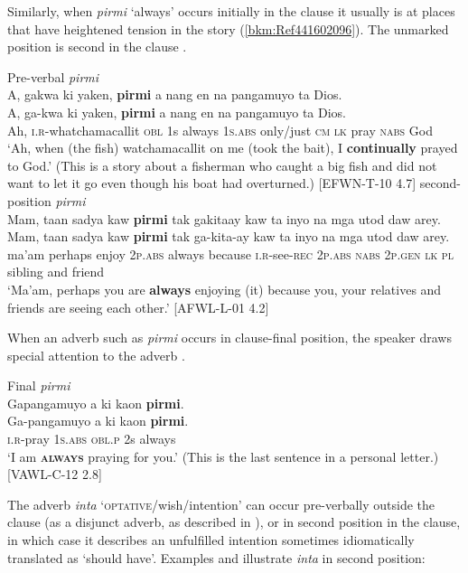 Similarly, when \textit{pirmi} ‘always’ occurs initially in the clause it usually is at places that have heightened tension in the story (\ref{bkm:Ref441602096}). The unmarked position is second in the clause .

\ea
\label{bkm:Ref441602096}Pre-verbal \textit{pirmi} \\
A,  gakwa  ki  yaken,  \textbf{pirmi}  a  nang  en  na  pangamuyo ta  Dios. \\\smallskip
 \gll A,  ga-kwa  ki  yaken,  \textbf{pirmi}  a  nang  en  na  pangamuyo ta  Dios. \\
Ah,  \textsc{i.r}-whatchamacallit  \textsc{obl}  1s  always  1\textsc{s.abs}  only/just  \textsc{cm}  \textsc{lk}  pray
\textsc{nabs}  God \\
\glt `Ah, when (the fish) watchamacallit on me (took the bait), I \textbf{continually} prayed to God.’ (This is a story about a fisherman who caught a big fish and did not want to let it  go even though his boat had overturned.) [EFWN-T-10 4.7]
\z
\ea
\label{bkm:Ref441602112}
second-position \textit{pirmi} \\
Mam,  taan  sadya  kaw  \textbf{pirmi}  tak  gakitaay  kaw ta  inyo  na  mga  utod  daw  arey. \\\smallskip
 \gll Mam,  taan  sadya  kaw  \textbf{pirmi}  tak  ga-kita-ay  kaw ta  inyo  na  mga  utod  daw  arey. \\
ma’am  perhaps  enjoy  2\textsc{p.abs}  always  because  \textsc{i.r}-see-\textsc{rec}  2\textsc{p.abs} \textsc{nabs}  2\textsc{p.gen}  \textsc{lk}  \textsc{pl}  sibling  and  friend \\
\glt `Ma’am, perhaps you are \textbf{always} enjoying (it) because you, your relatives and friends are seeing each other.’ [AFWL-L-01 4.2]
\z

When an adverb such as \textit{pirmi} occurs in clause-final position, the speaker draws special attention to the adverb .

\ea
\label{bkm:Ref441602199}
Final \textit{pirmi} \\
Gapangamuyo  a  ki  kaon  \textbf{pirmi}. \\\smallskip
 \gll Ga-pangamuyo  a  ki  kaon  \textbf{pirmi}. \\
\textsc{i.r}-pray  1\textsc{s.abs}  \textsc{obl.p}  2s  always \\
\glt ‘I am \textbf{\textsc{always}} praying for you.’ (This is the last sentence in a personal letter.) [VAWL-C-12 2.8]
\z

The adverb \textit{inta} ‘\textsc{optative}/wish/intention’ can occur pre-verbally outside the clause (as a disjunct adverb, as described in ), or in second position in the clause, in which case it describes an unfulfilled intention sometimes idiomatically translated as ‘should have’. Examples  and  illustrate \textit{inta} in second position:

